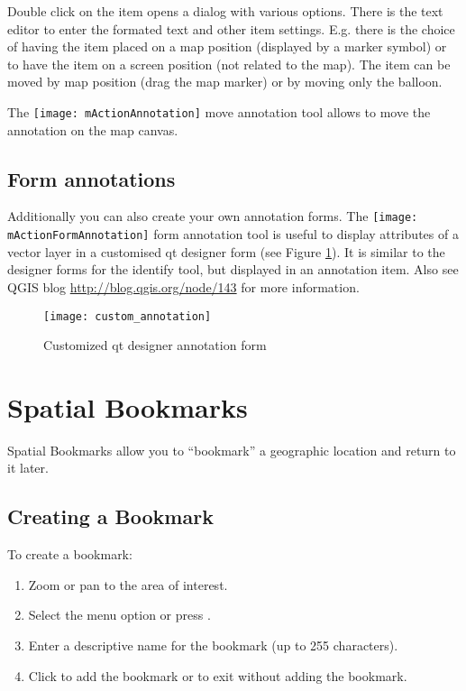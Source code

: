 Double click on the item opens a dialog with various options. There is the
text editor to enter the formated text and other item settings. E.g. there
is the choice of having the item placed on a map position (displayed by
a marker symbol) or to have the item on a screen position (not related
to the map). The item can be moved by map position (drag the map marker)
or by moving only the balloon.

The \texttt{[image: mActionAnnotation]} move annotation
tool allows to move the annotation on the map canvas.

\subsection{Form annotations}

Additionally you can also create your own annotation forms. The
\texttt{[image: mActionFormAnnotation]} form annotation
tool is useful to display attributes of a vector layer in a customised qt
designer form (see Figure \ref{fig:custom-annotations}). It is similar to the
designer forms for the identify tool, but displayed in an annotation item.
Also see QGIS blog \url{http://blog.qgis.org/node/143} for more information.

\begin{figure}[ht]
   \centering
   \texttt{[image: custom\_annotation]}
   \caption{Customized qt designer annotation form \nixcaption}
   \label{fig:custom-annotations}
\end{figure}

\newpage

\section{Spatial Bookmarks}\label{sec:bookmarks}

Spatial Bookmarks allow you to ``bookmark'' a geographic location and return to it later.

\subsection{Creating a Bookmark}
To create a bookmark:
\begin{enumerate}
\item Zoom or pan to the area of interest.
\item Select the menu option  \arrow {} or press .
\item Enter a descriptive name for the bookmark (up to 255 characters).
\item Click  to add the bookmark or  to exit without adding the bookmark.
\end{enumerate}

